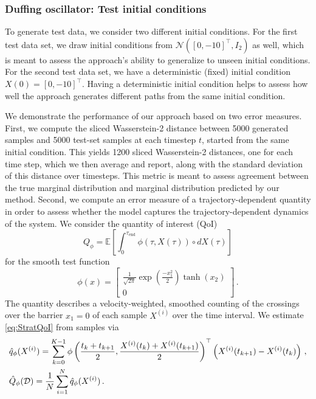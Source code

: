 \documentclass[oneside,11pt]{article}
\theoremstyle{remark}
\begin{document}
\subsubsection{Duffing oscillator: Test initial conditions}\label{sec:NumExp:Duffing:TestInit}
To generate test data, we consider two different initial conditions.  For the first test data set, we draw initial conditions from $\mathcal{N}([0, -10]^{\top}, I_2)$ as well, which is meant to assess the approach's ability to generalize to unseen initial conditions. For the second test data set, we have a deterministic (fixed) initial condition $X(0) = [0, -10]^{\top}$. Having a deterministic initial condition helps to assess how well the approach generates different paths from the same initial condition. 

We demonstrate the performance of our approach based on two error measures. First, we compute the sliced Wasserstein-2 distance between 5000 generated samples and 5000 test-set samples at each timestep $t$, started from the same initial condition. This yields 1200 sliced Wasserstein-2 distances, one for each time step, which we then average and report, along with the standard deviation of this distance over timesteps. This metric is meant to assess agreement between the true marginal distribution and marginal distribution predicted by our method.
Second, we compute an error measure of a trajectory-dependent quantity in order to assess whether the model captures the trajectory-dependent dynamics of the system. We consider the quantity of interest (QoI) \begin{equation}\label{eq:StratQoI}
        Q_{\phi} = \mathbb{E} \left[\int_0^{\tau_{\textrm{end}}} \phi(\tau,X(\tau)) \circ dX(\tau) \right]
    \end{equation}
    for the smooth test function 
    \begin{equation}\label{eq:DuffingQoI}
        \phi(x) = \begin{bmatrix}
            \frac{1}{\sqrt{2\pi}}\exp(\frac{-x_1^2}{2}) \tanh(x_2) \\
            0
        \end{bmatrix}\,.
    \end{equation}
    The quantity describes a velocity-weighted, smoothed counting of the crossings over the barrier $x_1=0$ of each sample $X^{(i)}$ over the time interval. 
We estimate \eqref{eq:StratQoI} from samples via 
\begin{align}\label{eq:StratMidpoint}\small
        & \hat{q}_{\phi}(X^{(i)}) =  \sum_{k=0}^{K-1} \phi \left(\frac{t_k+t_{k+1}}{2},\frac{X^{(i)}(t_k)+X^{(i)}(t_{k+1})}{2} \right)^\top \left(X^{(i)}(t_{k+1}) -  X^{(i)}(t_k)\right)\,, \\
        & \hat{Q}_{\phi}(\mathcal{D}) = \frac{1}{N}\sum_{i=1}^N \hat{q}_{\phi}(X^{(i)})\, \nonumber.
    \end{align}
\end{document}
